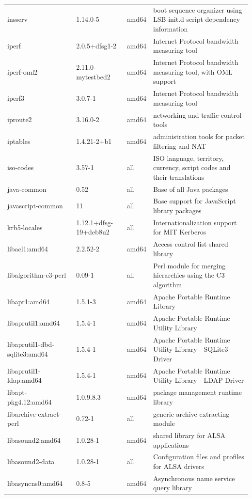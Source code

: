 \documentclass[a4paper,10pt]{article}
\begin{document}
\begin{appendices}
{\begin{longtable}{p{3.25cm}@{\hspace{0.25cm}}p{4cm}@{\hspace{0.25cm}}l@{\hspace{0.25cm}}p{7cm}}
insserv	&	1.14.0-5	&	amd64	&	boot sequence organizer using LSB init.d script dependency information	\\
iperf	&	2.0.5+dfsg1-2	&	amd64	&	Internet Protocol bandwidth measuring tool	\\
iperf-oml2	&	2.11.0-mytestbed2	&	amd64	&	Internet Protocol bandwidth measuring tool, with OML support	\\
iperf3	&	3.0.7-1	&	amd64	&	Internet Protocol bandwidth measuring tool	\\
iproute2	&	3.16.0-2	&	amd64	&	networking and traffic control tools	\\
iptables	&	1.4.21-2+b1	&	amd64	&	administration tools for packet filtering and NAT	\\
iso-codes	&	3.57-1	&	all	&	ISO language, territory, currency, script codes and their translations	\\
java-common	&	0.52	&	all	&	Base of all Java packages	\\
javascript-common	&	11	&	all	&	Base support for JavaScript library packages	\\
krb5-locales	&	1.12.1+dfsg-19+deb8u2	&	all	&	Internationalization support for MIT Kerberos	\\
libacl1:amd64	&	2.2.52-2	&	amd64	&	Access control list shared library	\\
libalgorithm-c3-perl	&	0.09-1	&	all	&	Perl module for merging hierarchies using the C3 algorithm	\\
libapr1:amd64	&	1.5.1-3	&	amd64	&	Apache Portable Runtime Library	\\
libaprutil1:amd64	&	1.5.4-1	&	amd64	&	Apache Portable Runtime Utility Library	\\
libaprutil1-dbd-sqlite3:amd64	&	1.5.4-1	&	amd64	&	Apache Portable Runtime Utility Library - SQLite3 Driver	\\
libaprutil1-ldap:amd64	&	1.5.4-1	&	amd64	&	Apache Portable Runtime Utility Library - LDAP Driver	\\
libapt-pkg4.12:amd64	&	1.0.9.8.3	&	amd64	&	package management runtime library	\\
libarchive-extract-perl	&	0.72-1	&	all	&	generic archive extracting module	\\
libasound2:amd64	&	1.0.28-1	&	amd64	&	shared library for ALSA applications	\\
libasound2-data	&	1.0.28-1	&	all	&	Configuration files and profiles for ALSA drivers	\\
libasyncns0:amd64	&	0.8-5	&	amd64	&	Asynchronous name service query library	\\

\end{longtable}}
\end{appendices}
\end{document}
